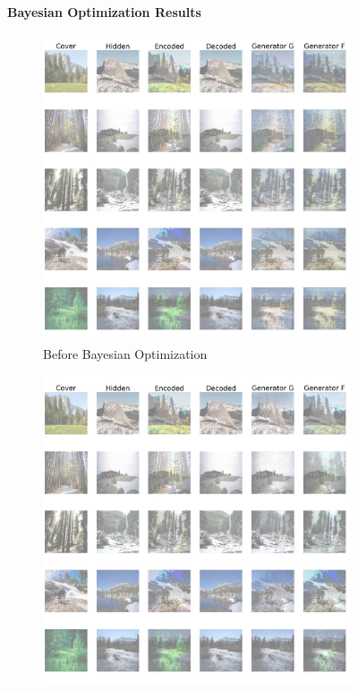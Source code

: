 \documentclass[conference]{IEEEtran}
\begin{document}
\begin{figure}[!hbt]
\centering
\textbf{Bayesian Optimization Results}\par\medskip
    \begin{subfigure}[b]{0.28\textwidth}
    \centering
            \includegraphics[scale=0.08,clip=false]{images/bayes_bad.jpg}
            \caption{Before Bayesian Optimization}
            \label{Bayes_Bad}
    \end{subfigure}
    \hspace{0.05\textwidth}
    \begin{subfigure}[b]{0.28\textwidth}
    \centering
            \includegraphics[scale=0.08,clip=false]{images/bayes_good.jpg}

\end{subfigure}
\end{figure}
\end{document}
